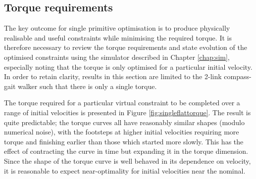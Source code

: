 \subsection{Torque requirements}
The key outcome for single primitive optimisation is to produce physically realisable and useful constraints while minimising the required torque. It is therefore necessary to review the torque requirements and state evolution of the optimised constraints using the simulator described in Chapter \ref{chap:sim}, especially noting that the torque is only optimised for a particular initial velocity. In order to retain clarity, results in this section are limited to the 2-link compass-gait walker such that there is only a single torque.

The torque required for a particular virtual constraint to be completed over a range of initial velocities is presented in Figure \ref{fig:singleflattorque}. The result is quite predictable; the torque curves all have reasonably similar shapes (modulo numerical noise), with the footsteps at higher initial velocities requiring more torque and finishing earlier than those which started more slowly. This has the effect of contracting the curve in time but expanding it in the torque dimension. Since the shape of the torque curve is well behaved in its dependence on velocity, it is reasonable to expect near-optimality for initial velocities near the nominal.

